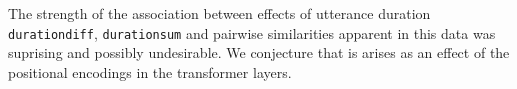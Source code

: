 

The strength of the association between effects of utterance
duration {\tt durationdiff}, {\tt durationsum} and pairwise similarities apparent in this
data was suprising and possibly undesirable. We conjecture that is
arises as an effect of the positional encodings in the transformer
layers.

